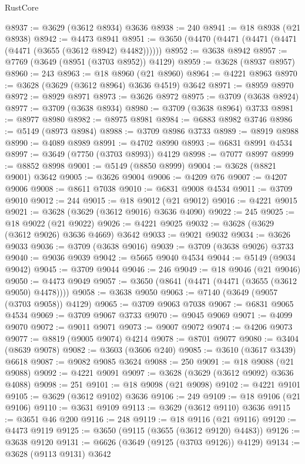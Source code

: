 \begin{lexlean}{RustCore}
\begin{coremodule}
@8937 := @3629 (@3612 @8934) @3636
@8938 := 240
@8941 := @18 @8938 (@21 @8938)
@8942 := @4473 @8941
@8951 := @3650 (@4470 (@4471 (@4471 (@4471 (@4471 (@3655 (@3612 @8942) @4482))))))
@8952 := @3638 @8942
@8957 := @7769 (@3649 (@8951 (@3703 @8952)) @4129)
@8959 := @3628 (@8937 @8957)
@8960 := 243
@8963 := @18 @8960 (@21 @8960)
@8964 := @4221 @8963
@8970 := @3628 (@3629 (@3612 @8964) @3636 @4519) @3642
@8971 := @8959 @8970
@8972 := @8929 @8971
@8973 := @3626 @8972
@8975 := @3709 (@3638 @8924)
@8977 := @3709 (@3638 @8934)
@8980 := @3709 (@3638 @8964) @3733
@8981 := @8977 @8980
@8982 := @8975 @8981
@8984 := @6883 @8982 @3746
@8986 := @5149 (@8973 @8984)
@8988 := @3709 @8986 @3733
@8989 := @8919 @8988
@8990 := @4089 @8989
@8991 := @4702 @8990
@8993 := @6831 @8991 @4534
@8997 := @3649 (@7750 (@3703 @8993)) @4129
@8998 := @7077 @8997
@8999 := @8852 @8998
@9001 := @5149 (@8850 @8999)
@9004 := @3628 (@8821 @9001) @3642
@9005 := @3626 @9004
@9006 := @4209 @76
@9007 := @4207 @9006
@9008 := @8611 @7038
@9010 := @6831 @9008 @4534
@9011 := @3709 @9010
@9012 := 244
@9015 := @18 @9012 (@21 @9012)
@9016 := @4221 @9015
@9021 := @3628 (@3629 (@3612 @9016) @3636 @4090)
@9022 := 245
@9025 := @18 @9022 (@21 @9022)
@9026 := @4221 @9025
@9032 := @3628 (@3629 (@3612 @9026) @3636 @4669) @3642
@9033 := @9021 @9032
@9034 := @3626 @9033
@9036 := @3709 (@3638 @9016)
@9039 := @3709 (@3638 @9026) @3733
@9040 := @9036 @9039
@9042 := @5665 @9040 @4534
@9044 := @5149 (@9034 @9042)
@9045 := @3709 @9044
@9046 := 246
@9049 := @18 @9046 (@21 @9046)
@9050 := @4473 @9049
@9057 := @3650 (@8641 (@4471 (@4471 (@3655 (@3612 @9050) @4478))))
@9058 := @3638 @9050
@9063 := @7140 (@3649 (@9057 (@3703 @9058)) @4129)
@9065 := @3709 @9063 @7038
@9067 := @6831 @9065 @4534
@9069 := @3709 @9067 @3733
@9070 := @9045 @9069
@9071 := @4099 @9070
@9072 := @9011 @9071
@9073 := @9007 @9072
@9074 := @4206 @9073
@9077 := @8819 (@9005 @9074) @4214
@9078 := @8701 @9077
@9080 := @3404 (@8639 @9078)
@9082 := @3603 (@3606 @240)
@9085 := @3610 (@3617 @3439) @6618
@9087 := @9082 @9085 @3624
@9088 := 250
@9091 := @18 @9088 (@21 @9088)
@9092 := @4221 @9091
@9097 := @3628 (@3629 (@3612 @9092) @3636 @4088)
@9098 := 251
@9101 := @18 @9098 (@21 @9098)
@9102 := @4221 @9101
@9105 := @3629 (@3612 @9102) @3636
@9106 := 249
@9109 := @18 @9106 (@21 @9106)
@9110 := @3631 @9109
@9113 := @3629 (@3612 @9110) @3636
@9115 := @3651 @46 @200
@9116 := 248
@9119 := @18 @9116 (@21 @9116)
@9120 := @4473 @9119
@9125 := @3650 (@9115 (@3655 (@3612 @9120) @4483))
@9126 := @3638 @9120
@9131 := @6626 (@3649 (@9125 (@3703 @9126)) @4129)
@9134 := @3628 (@9113 @9131) @3642

\end{coremodule}
\end{lexlean}
